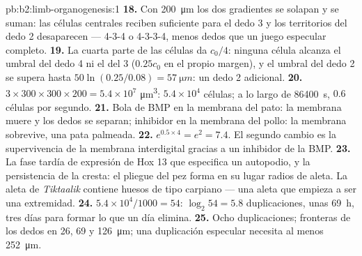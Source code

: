 \begin{solution}{pb:b2:limb-organogenesis:1}
\textbf{18.} Con \qty{200}{\micro m} los dos gradientes se solapan y se
suman: las células centrales reciben suficiente para el dedo 3 y los
territorios del dedo 2 desaparecen --- 4-3-4 o 4-3-3-4, menos dedos que un
juego especular completo.
\textbf{19.} La cuarta parte de las células da $c_0/4$: ninguna célula
alcanza el umbral del dedo 4 ni el del 3 ($0.25 c_0$ en el propio margen),
y el umbral del dedo 2 se supera hasta $50\ln(0.25/0.08) =
\qty{57}{\micro m}$: un dedo 2 adicional.
\textbf{20.} $3\times 300\times 300\times 200 = 5.4\times 10^{7}$
\unit{\micro m^3}: $5.4\times 10^{4}$ células; a lo largo de
\qty{86400}{s}, $0.6$ células por segundo.
\textbf{21.} Bola de BMP en la membrana del pato: la membrana muere y los
dedos se separan; inhibidor en la membrana del pollo: la membrana
sobrevive, una pata palmeada.
\textbf{22.} $e^{0.5\times 4} = e^{2} = 7.4$. El segundo cambio es la
supervivencia de la membrana interdigital gracias a un inhibidor de la
BMP.
\textbf{23.} La fase tardía de expresión de Hox 13 que especifica un
autopodio, y la persistencia de la cresta: el pliegue del pez forma en su
lugar radios de aleta. La aleta de \emph{Tiktaalik} contiene huesos de
tipo carpiano --- una aleta que empieza a ser una extremidad.
\textbf{24.} $5.4\times 10^{4}/1000 = 54$: $\log_2 54 = 5.8$ duplicaciones,
unas \qty{69}{h}, tres días para formar lo que un día elimina.
\textbf{25.} Ocho duplicaciones; fronteras de los dedos en 26, 69 y
\qty{126}{\micro m}; una duplicación especular necesita al menos
\qty{252}{\micro m}.
\end{solution}

